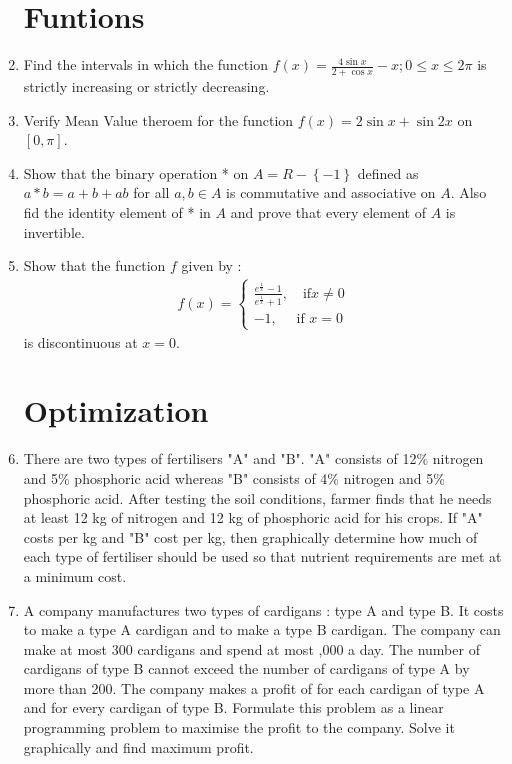 \documentclass[12pt,-letter paper]{article}
\theoremstyle{remark}
\providecommand{\sbrak}[1]{\ensuremath{{}\left[#1\right]}}
\providecommand{\brak}[1]{\ensuremath{\left(#1\right)}}
\providecommand{\cbrak}[1]{\ensuremath{\left\{#1\right\}}}
\begin{document}
\begin{enumerate}
            \section{Funtions}
      \item Find the intervals in which the function $f\brak{x}= \frac{4\sin x}{2+\cos x} -x ; 0 \leq x \leq 2\pi$ is strictly increasing or strictly decreasing.
      \item Verify Mean Value theroem for the function $f\brak{x}= 2\sin x + \sin 2x$ on $\sbrak{0,\pi}$.
      \item Show that the binary operation * on $ A=R -\cbrak{-1}$ defined as $a*b= a+b+ab$ for all $a,b \in A$ is commutative and associative on $A$. Also fid the identity element of * in $A$ and prove that every element of $A$ is invertible.\item Show that the function $f$ given by :
            \begin{align*}
                  f\brak{x} = \begin{cases}
                                    \frac{e^{\frac{1}{x}}-1}{e^{\frac{1}{x}}+1} ,\quad \text{if} x\neq 0 \\
                                    -1,\quad \text{ if } x=0
                              \end{cases}
            \end{align*}
            is discontinuous at $x=0$.
            \section{Optimization}
      \item There are two types of fertilisers "A" and "B". "A" consists of 12\% nitrogen and 5\% phosphoric acid whereas "B" consists of 4\% nitrogen and 5\% phosphoric acid. After testing the soil conditions, farmer finds that he needs at least 12 kg of nitrogen and 12 kg of phosphoric acid for his crops. If "A" costs  per kg and "B" cost  per kg, then graphically determine how much of each type of fertiliser should be used so that nutrient requirements are met at a minimum cost.


      \item A company manufactures two types of cardigans : type A and type B. It costs  to make a type A cardigan and  to make a type B cardigan. The company can make at most 300 cardigans and spend at most ,000 a day. The number of cardigans of type B cannot exceed the number of cardigans of type A by more than 200. The company makes a profit of  for each cardigan of type A and  for every cardigan of type B. Formulate this problem as a linear programming problem to maximise the profit to the company. Solve it graphically and find maximum profit.
\end{enumerate}
\end{document}
